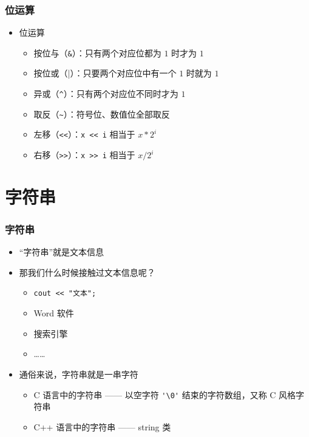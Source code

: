 \begin{frame}[fragile]
    \frametitle{位运算}

    \begin{itemize}
        \item 位运算
            \begin{itemize}
                \item 按位与（\lstinline|&|）：只有两个对应位都为 $1$ 时才为 $1$
                \item 按位或（\lstinline|||）：只要两个对应位中有一个 $1$ 时就为 $1$
                \item 异或（\lstinline|^|）：只有两个对应位不同时才为 $1$
                \item 取反（\lstinline|~|）：符号位、数值位全部取反
                \item 左移（\lstinline|<<|）：\lstinline|x << i| 相当于 $x * 2^i$
                \item 右移（\lstinline|>>|）：\lstinline|x >> i| 相当于 $x / {2^i}$
            \end{itemize}
    \end{itemize}

\end{frame}

\section{字符串}

\begin{frame}[fragile]
    \frametitle{字符串}

    \begin{itemize}
        \item<1-> “字符串”就是文本信息
        \item<1-> 那我们什么时候接触过文本信息呢？
            \begin{itemize}
                \item \lstinline|cout << "文本";|
                \item Word 软件
                \item 搜索引擎
                \item ……
            \end{itemize}

        \item<2-> 通俗来说，字符串就是一串字符
            \begin{itemize}
                \item C 语言中的字符串 —— 以空字符 \lstinline|'\0'| 结束的字符数组，又称 C 风格字符串
                \item C++ 语言中的字符串 —— string 类
            \end{itemize}
    \end{itemize}

\end{frame}


